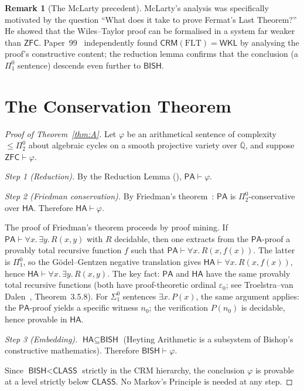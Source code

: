 \documentclass[11pt,a4paper]{article}
\theoremstyle{plain}
\theoremstyle{definition}
\newtheorem{remark}[theorem]{Remark}
\newcommand{\BISH}{\textsf{BISH}}
\newcommand{\WKL}{\textsf{WKL}}
\newcommand{\CLASS}{\textsf{CLASS}}
\newcommand{\CRM}{\textsf{CRM}}
\newcommand{\HA}{\textsf{HA}}
\newcommand{\PA}{\textsf{PA}}
\newcommand{\ZFC}{\textsf{ZFC}}
\newcommand{\Q}{\mathbb{Q}}
\begin{document}
\begin{remark}[The McLarty precedent]
McLarty's analysis was specifically motivated by the question ``What does it take to prove Fermat's Last Theorem?''  He showed that the Wiles--Taylor proof can be formalised in a system far weaker than $\ZFC$.  Paper~99~\cite{p99} independently found $\CRM(\mathrm{FLT}) = \WKL$ by analysing the proof's constructive content; the reduction lemma confirms that the conclusion (a $\Pi^0_1$ sentence) descends even further to $\BISH$.
\end{remark}


\section{The Conservation Theorem}\label{sec:conservation}

\begin{proof}[Proof of Theorem~\ref{thm:A}]
Let $\varphi$ be an arithmetical sentence of complexity $\le \Pi^0_2$ about algebraic cycles on a smooth projective variety over $\overline{\Q}$, and suppose $\ZFC \vdash \varphi$.

\emph{Step 1 (Reduction).}  By the Reduction Lemma (), $\PA \vdash \varphi$.

\emph{Step 2 (Friedman conservation).}  By Friedman's theorem~\cite{friedman1978}: $\PA$ is $\Pi^0_2$-conservative over $\HA$.  Therefore $\HA \vdash \varphi$.

The proof of Friedman's theorem proceeds by proof mining.  If $\PA \vdash \forall x.\, \exists y.\, R(x,y)$ with $R$ decidable, then one extracts from the $\PA$-proof a provably total recursive function $f$ such that $\PA \vdash \forall x.\, R(x, f(x))$.  The latter is $\Pi^0_1$, so the G\"odel--Gentzen negative translation gives $\HA \vdash \forall x.\, R(x, f(x))$, hence $\HA \vdash \forall x.\, \exists y.\, R(x,y)$.  The key fact: $\PA$ and $\HA$ have the same provably total recursive functions (both have proof-theoretic ordinal $\varepsilon_0$; see Troelstra--van Dalen~\cite{troelstra-vandalen1988}, Theorem~3.5.8).  For $\Sigma^0_1$ sentences $\exists x.\, P(x)$, the same argument applies: the $\PA$-proof yields a specific witness $n_0$; the verification $P(n_0)$ is decidable, hence provable in $\HA$.

\emph{Step 3 (Embedding).}  $\HA \subseteq \BISH$ (Heyting Arithmetic is a subsystem of Bishop's constructive mathematics).  Therefore $\BISH \vdash \varphi$.

Since $\BISH < \CLASS$ strictly in the CRM hierarchy, the conclusion $\varphi$ is provable at a level strictly below $\CLASS$.  No Markov's Principle is needed at any step.
\end{proof}
\end{document}
